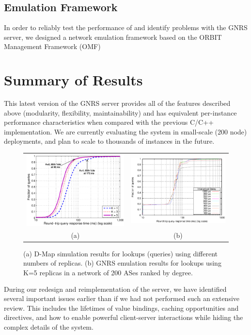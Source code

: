 \documentclass[10pt]{article}
\begin{document}
\subsection{Emulation Framework}
In order to reliably test the performance of and identify problems with the
GNRS server, we designed a network emulation framework based on the ORBIT
Management Framework (OMF) 

\section{Summary of Results}
This latest version of the GNRS server provides all of the features described
above (modularity, flexibility, maintainability) and has equivalent
per-instance performance characteristics when compared with the previous C/C++
implementation.  We are currently evaluating the system in small-scale
(200 node) deployments, and plan to scale to thousands of instances in the
future.

\begin{figure}[t]
	\begin{center}
		\begin{tabular}{cc}
			\includegraphics[width=0.5\linewidth]{fig/dmap-query-latency} &
			\includegraphics[width=0.5\linewidth]{fig/clt-lkp-deg} \\
			(a) & (b) \\
		\end{tabular}
		\caption{(a) D-Map simulation results for lookups (queries) using
		different numbers of replicas. (b) GNRS emulation results for lookups
	using K=5 replicas in a network of 200 ASes ranked by degree.}
		\label{fig:results}
	\end{center}
\end{figure}

During our redesign and reimplementation of the server, we have identified
several important issues earlier than if we had not performed such an
extensive review.  This includes the lifetimes of value bindings, caching
opportunities and directives, and how to enable powerful client-server
interactions while hiding the complex details of the system.



\end{document}
